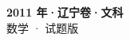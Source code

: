 \documentclass[zihao=-4, a4paper]{ctexart}
\begin{document}
\begin{center}
  {\Large\bfseries 2011 年·辽宁卷·文科}\\[4pt]
  {\large 数学 · 试题版}
\end{center}
\medskip
{}

\end{document}
